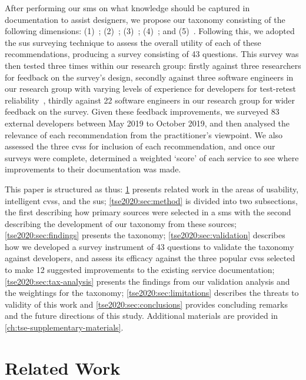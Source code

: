 After performing our \gls{sms} on what  knowledge should be captured in documentation to assist  designers, we propose our taxonomy consisting of the following dimensions: (1)~\dima{}; (2)~\dimb{}; (3)~\dimc{}; (4)~\dimd{}; and (5)~\dime{}. Following this, we adopted the \gls{sus} surveying technique to assess the overall utility of each of these recommendations, producing a survey consisting of 43 questions. This survey was then tested three times within our research group: firstly against three researchers for feedback on the survey's design, secondly against three software engineers in our research group with varying levels of experience for developers for test-retest reliability~\citep{Kitchenham:2007ux}, thirdly against 22 software engineers in our research group for wider feedback on the survey. Given these feedback improvements, we surveyed 83 external developers between May 2019 to October 2019, and then analysed the relevance of each recommendation from the practitioner's viewpoint. We also assessed the three \glspl{cvs} for inclusion of each recommendation, and once our surveys were complete, determined a weighted `score' of each service to see where improvements to their documentation was made.

This paper is structured as thus: \cref{tse2020:sec:related-work} presents related work in the areas of  usability, intelligent \glspl{cvs}, and the \gls{sus}; \cref{tse2020:sec:method} is divided into two subsections, the first describing how primary sources were selected in a \gls{sms} with the second describing the development of our taxonomy from these sources; \cref{tse2020:sec:findings} presents the taxonomy; \cref{tse2020:sec:validation} describes how we developed a survey instrument of 43 questions to validate the taxonomy against developers, and assess its efficacy against the three popular \glspl{cvs} selected to make 12 suggested improvements to the existing service  documentation; \cref{tse2020:sec:tax-analysis} presents the findings from our validation analysis and the weightings for the taxonomy; \cref{tse2020:sec:limitations} describes the threats to validity of this work and \cref{tse2020:sec:conclusions} provides concluding remarks and the future directions of this study. Additional materials are provided in \cref{ch:tse-supplementary-materials}.

\section{Related Work}
\label{tse2020:sec:related-work}



